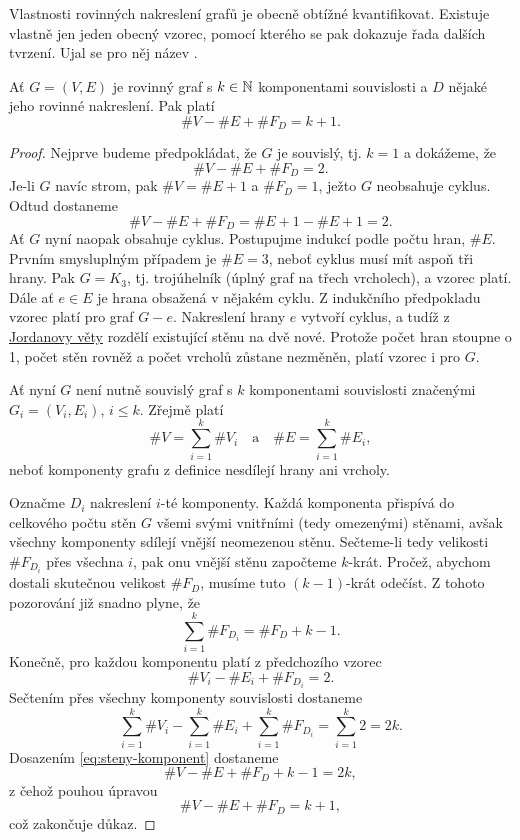 Vlastnosti rovinných nakreslení grafů je obecně obtížné kvantifikovat.
E\-xistuje vlastně jen jeden obecný vzorec, pomocí kterého se pak dokazuje řada
dalších tvrzení. Ujal se pro něj název .

\begin{claim}
 \label{claim:euleruv-vztah}
 Ať $G = (V,E)$ je rovinný graf s $k \in \mathbb{N}$ komponentami souvislosti a $D$
 nějaké jeho rovinné nakreslení. Pak platí
 \[
  \# V - \# E + \# F_D = k + 1.
 \]
\end{claim}
\begin{proof}
 Nejprve budeme předpokládat, že $G$ je souvislý, tj. $k = 1$ a dokážeme, že
 \[
  \# V - \# E + \# F_D = 2.
 \]
 Je-li $G$ navíc strom, pak $\# V = \# E + 1$ a $\# F_D = 1$, ježto $G$
 neobsahuje cyklus. Odtud dostaneme
 \[
  \# V - \# E + \# F_D = \# E + 1 - \# E + 1 = 2.
 \]
 Ať $G$ nyní naopak obsahuje cyklus. Postupujme indukcí podle počtu hran, $\#
 E$. Prvním smysluplným případem je $\# E = 3$, neboť cyklus musí mít aspoň tři
 hrany. Pak $G = K_3$, tj. trojúhelník (úplný graf na třech vrcholech), a vzorec
 platí. Dále ať $e \in E$ je hrana obsažená v nějakém cyklu. Z indukčního
 předpokladu vzorec platí pro graf $G - e$. Nakreslení hrany $e$ vytvoří cyklus,
 a tudíž z \hyperref[thm:jordanova-o-kruznici]{Jordanovy věty} rozdělí
 existující stěnu na dvě nové. Protože počet hran stoupne o 1, počet stěn rovněž
 a počet vrcholů zůstane nezměněn, platí vzorec i pro $G$.

 Ať nyní $G$ není nutně souvislý graf s $k$ komponentami souvislosti značenými
 $G_i = (V_i,E_i)$, $i \leq k$. Zřejmě platí
 \[
  \# V = \sum_{i = 1}^{k} \# V_i \quad \text{a} \quad \# E = \sum_{i=1}^{k} \#
  E_i,
 \]
 neboť komponenty grafu z definice nesdílejí hrany ani vrcholy.

 Označme $D_i$ nakreslení $i$-té komponenty. Každá komponenta přispívá do
 celkového počtu stěn $G$ všemi svými vnitřními (tedy omezenými) stěnami, avšak
 všechny komponenty sdílejí vnější neomezenou stěnu. Sečteme-li tedy velikosti
 $\# F_{D_i}$ přes všechna $i$, pak onu vnější stěnu započteme $k$-krát. Pročež,
 abychom dostali skutečnou velikost $\# F_D$, musíme tuto $(k-1)$-krát odečíst.
 Z tohoto pozorování již snadno plyne, že
 \begin{equation}
  \label{eq:steny-komponent}
  \tag{$*$}
  \sum_{i=1}^{k} \# F_{D_i} = \# F_D + k - 1.
 \end{equation}
 Konečně, pro každou komponentu platí z předchozího vzorec
 \[
  \# V_i - \# E_i + \# F_{D_i} = 2.
 \]
 Sečtením přes všechny komponenty souvislosti dostaneme
 \[
  \sum_{i = 1}^{k} \# V_i - \sum_{i = 1}^{k} \# E_i + \sum_{i = 1}^{k} \#
  F_{D_i} = \sum_{i = 1}^{k} 2 = 2k.
 \]
 Dosazením \eqref{eq:steny-komponent} dostaneme
 \[
  \# V - \# E + \# F_D + k - 1 = 2k,
 \]
 z čehož pouhou úpravou
 \[
  \# V - \# E + \# F_D = k + 1,
 \]
 což zakončuje důkaz.
\end{proof}

